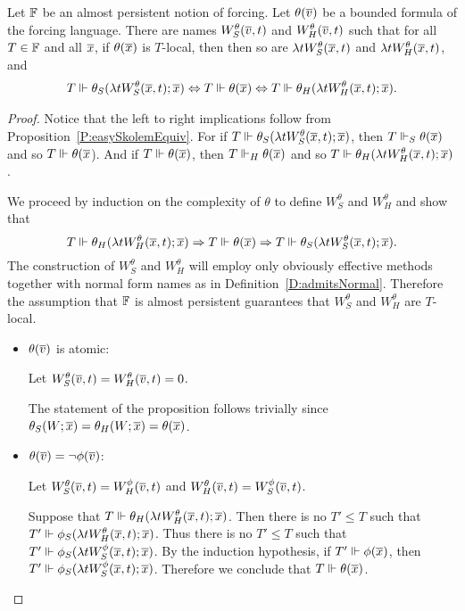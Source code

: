 \begin{prop}[\RCAo]\label{P:witnessBnded}
Let $\mathbb{F}$ be an almost persistent notion of forcing.
Let $\theta(\overline{v})$ be a bounded formula of the forcing language.
There are names $W^\theta_S(\overline{v},t)$ and $W^\theta_H(\overline{v},t)$
such that for all $T\in\mathbb{F}$ and all $\overline{x}$, if $\theta(\overline{x})$ is $T$-local,
then then so are $\lambda tW^\theta_S(\overline{x},t)$ and $\lambda tW^\theta_H(\overline{x},t)$, and
\begin{align*}
T\Vdash\theta_S(\lambda tW_S^\theta(\overline{x},t);\overline{x})
	\Leftrightarrow  T\Vdash\theta(\overline{x})
	\Leftrightarrow  T\Vdash\theta_H(\lambda tW_H^\theta(\overline{x},t);\overline{x}).
\end{align*}
\end{prop}

\begin{proof}
Notice that the left to right implications follow
from Proposition~\ref{P:easySkolemEquiv}.
For if $T\Vdash\theta_S(\lambda tW_S^\theta(\overline{x},t);\overline{x})$,
then $T\Vdash_S\theta(\overline{x})$ and so $T\Vdash\theta(\overline{x}$).
And if $T\Vdash\theta(\overline{x})$, then $T\Vdash_H\theta(\overline{x})$
and so $T\Vdash\theta_H(\lambda tW_H^\theta(\overline{x},t);\overline{x})$.

We proceed by induction on the complexity of $\theta$
to define $W^\theta_S$ and $W^\theta_H$ and show that
$$T\Vdash\theta_H(\lambda tW_H^\theta(\overline{x},t);\overline{x})
	\Rightarrow   T\Vdash\theta(\overline{x})
	\Rightarrow  T\Vdash\theta_S(\lambda tW_S^\theta(\overline{x},t);\overline{x}).$$
The construction of $W^\theta_S$ and $W^\theta_H$ will employ only
obviously effective methods together with normal form names as in Definition~\ref{D:admitsNormal}.
Therefore the assumption that $\mathbb{F}$ is almost persistent guarantees
that $W^\theta_S$ and $W^\theta_H$ are $T$-local.

\begin{itemize}
\item $\theta(\overline{v})$ is atomic:

Let $W^\theta_S(\overline{v},t)=W^\theta_H(\overline{v},t)=0$.

The statement of the proposition follows trivially
since $\theta_S(W;\overline{x})=\theta_H(W;\overline{x})=\theta(\overline{x})$.

\item $\theta(\overline{v})=\neg\phi(\overline{v})$:

Let $W^\theta_S(\overline{v},t)=W^\phi_H(\overline{v},t)$ and
$W^\theta_H(\overline{v},t)=W^\phi_S(\overline{v},t)$.

Suppose that $T\Vdash\theta_H(\lambda tW_H^\theta(\overline{x},t);\overline{x})$.
Then there is no $T'\leq T$ such that
$T'\Vdash\phi_S(\lambda tW_H^\theta(\overline{x},t);\overline{x})$.
Thus there is no $T'\leq T$ such that
$T'\Vdash\phi_S(\lambda tW_S^\phi(\overline{x},t);\overline{x})$.
By the induction hypothesis, if $T'\Vdash\phi(\overline{x})$, then
$T'\Vdash\phi_S(\lambda tW_S^\phi(\overline{x},t);\overline{x})$.
Therefore we conclude that $T\Vdash\theta(\overline{x})$.


\end{itemize}
\end{proof}
